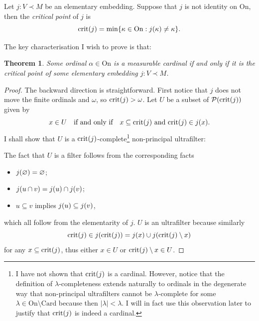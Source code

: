 \documentclass[12pt]{article}
\theoremstyle{plain}
\newtheorem{theorem}{Theorem}[section]
\theoremstyle{definition}
\newcommand{\On}{\mathrm{On}}
\newcommand{\Card}{\mathrm{Card}}
\DeclareMathOperator{\crit}{crit}
\begin{document}
\begin{definition}
	Let $j : V \prec M$ be an elementary embedding. Suppose that $j$ is not identity on $\On$, then the \emph{critical point} of $j$ is
	\[\crit\mleft(j\mright) = \min\mleft\{\kappa \in \On : j\mleft(\kappa\mright) \neq \kappa\mright\}.\]
\end{definition}

The key characterisation I wish to prove is that:

\begin{theorem}
	\label{thm:measurable-cardinals-are-critical-points}
	Some ordinal $\alpha \in \On$ is a measurable cardinal if and only if it is the critical point of some elementary embedding $j : V \prec M$.
\end{theorem}

\begin{proof}
	The backward direction is straightforward. First notice that $j$ does not move the finite ordinals and $\omega$, so $\crit\mleft(j\mright) > \omega$. Let $U$ be a subset of $\mathcal{P}\mleft(\crit\mleft(j\mright)\mright)$ given by
	\[x \in U \quad \text{if and only if} \quad \text{$x \subseteq \crit\mleft(j\mright)$ and $\crit\mleft(j\mright) \in j\mleft(x\mright)$}.\]
	I shall show that $U$ is a $\crit\mleft(j\mright)$-complete\footnote{I have not shown that $\crit\mleft(j\mright)$ is a cardinal. However, notice that the definition of $\lambda$-completeness extends naturally to ordinals in the degenerate way that non-principal ultrafilters cannot be $\lambda$-complete for some $\lambda \in \On \setminus \Card$ because then $\left|\lambda\right| < \lambda$. I will in fact use this observation later to justify that $\crit\mleft(j\mright)$ is indeed a cardinal.} non-principal ultrafilter:

	The fact that $U$ is a filter follows from the corresponding facts
	\begin{itemize}
		\item $j\mleft(\varnothing\mright) = \varnothing$;
		\item $j\mleft(u \cap v\mright) = j\mleft(u\mright) \cap j\mleft(v\mright)$;
		\item $u \subseteq v$ implies $j\mleft(u\mright) \subseteq j\mleft(v\mright)$,
	\end{itemize}
	which all follow from the elementarity of $j$. $U$ is an ultrafilter because similarly
	\[\crit\mleft(j\mright) \in j\mleft(\crit\mleft(j\mright)\mright) = j\mleft(x\mright) \cup j\mleft(\crit\mleft(j\mright) \setminus x\mright)\]
	for any $x \subseteq \crit\mleft(j\mright)$, thus either $x \in U$ or $\crit\mleft(j\mright) \setminus x \in U$.


\end{proof}
\end{document}
